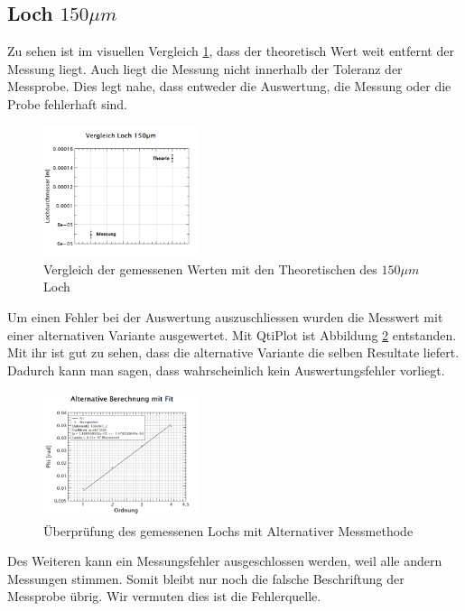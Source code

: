 \subsection*{Loch $150\mu m$}
Zu sehen ist im visuellen Vergleich \ref{fig:dis_loch_150}, dass der theoretisch Wert weit entfernt der Messung liegt. Auch liegt die Messung nicht innerhalb der Toleranz  der Messprobe. Dies legt nahe, dass entweder die Auswertung, die Messung oder die Probe fehlerhaft sind.
\begin{figure}[H]
	\centering
	\includegraphics[width=0.4\textwidth]{data/dis_loch_150.png}
	\caption{Vergleich der gemessenen Werten mit den Theoretischen des $150\mu m$ Loch}
	\label{fig:dis_loch_150}
\end{figure}
Um einen Fehler bei der Auswertung auszuschliessen wurden die Messwert mit einer alternativen Variante ausgewertet. Mit QtiPlot ist Abbildung \ref{fig:dis_loch_fail} entstanden. Mit ihr ist gut zu sehen, dass die alternative Variante die selben Resultate liefert. Dadurch kann man sagen, dass wahrscheinlich kein Auswertungsfehler vorliegt.
\begin{figure}[H]
	\centering
	\includegraphics[width=0.4\textwidth]{data/fit_felerhaftes_loch.png}
	\caption{Überprüfung des gemessenen Lochs mit Alternativer Messmethode}
	\label{fig:dis_loch_fail}
\end{figure}

Des Weiteren kann ein Messungsfehler ausgeschlossen werden, weil alle andern Messungen stimmen. Somit bleibt nur noch die falsche Beschriftung der Messprobe übrig. Wir vermuten dies ist die Fehlerquelle.

